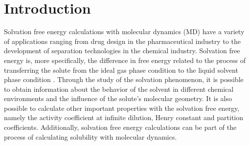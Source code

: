 \chapter{Introduction} %
\label{Chapter1} %
\pagestyle{simple}
\doublespacing
Solvation free energy calculations with molecular dynamics (MD) have a variety of applications ranging from drug design in the pharmaceutical industry to the development of separation technologies in the chemical industry. {Solvation free energy is, more specifically, the difference in free energy related to the process of transferring the solute from the ideal gas phase condition to the liquid solvent phase condition \cite{shirts2013}}. Through the study of the solvation phenomenon, it is possible to obtain information about the behavior of the solvent in different chemical environments and the influence of the solute's molecular geometry. It is also possible to calculate other important properties with the solvation free energy, namely the activity coefficient at infinite dilution, Henry constant and partition coefficients.{ Additionally, solvation free energy calculations can be part of the process of calculating solubility with molecular dynamics}. 

